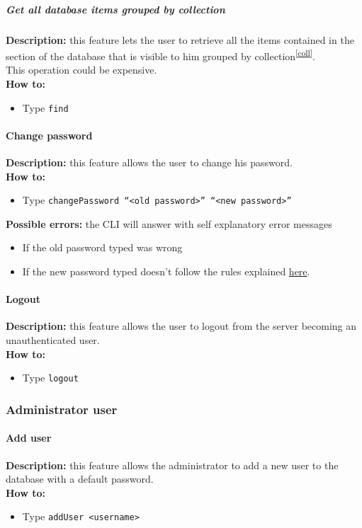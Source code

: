 \documentclass{scalatekids-article}
\begin{document}
\subparagraph{Get all database items grouped by collection}
\textbf{Description:} this feature lets the user to retrieve all the items contained in the section of the database that is visible to him grouped by collection\textsuperscript{\ref{coll}}.\\
This operation could be expensive.\\
\textbf{How to:}
\begin{itemize}
\item Type \texttt{find}
\end{itemize}

\paragraph{Change password}
\label{sec:changepassword}
\textbf{Description:} this feature allows the user to change his password.\\
\textbf{How to:}
\begin{itemize}
\item Type \texttt{changePassword ``<old password>'' ``<new password>''}
\end{itemize}
\textbf{Possible errors:} the CLI will answer with self explanatory error messages
\begin{itemize}
\item If the old password typed was wrong
\item If the new password typed doesn't follow the rules explained \hyperref[sec:passwordrequirement]{here}.
\end{itemize}

\paragraph{Logout}
\label{sec:logout}
\textbf{Description:} this feature allows the user to logout from the server becoming an unauthenticated user.\\
\textbf{How to:}
\begin{itemize}
\item Type \texttt{logout}
\end{itemize}

\subsubsection{Administrator user}
\label{sec:administratoruser}

\paragraph{Add user}
\label{sec:adduser}
\textbf{Description:} this feature allows the administrator to add a new user to the database with a default password.\\
\textbf{How to:}
\begin{itemize}
\item Type \texttt{addUser <username>}
\end{itemize}
\end{document}
